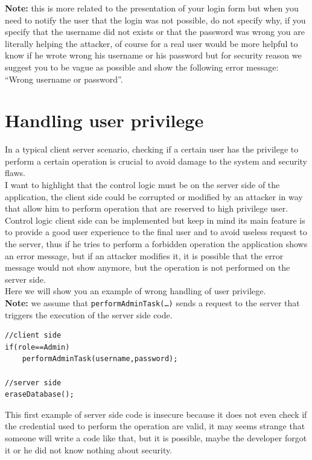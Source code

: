\textbf{Note:} this is more related to the presentation of your login form but when you need to notify the user that the login was not possible, do not specify why, if you specify that the username did not exists or that the password was wrong you are literally helping the attacker, of course for a real user would be more helpful to know if he wrote wrong his username or his password but for security reason we suggest you to be vague as possible and show the following error message: “Wrong username or password”.

\section{Handling user privilege}
In a typical client server scenario, checking if a certain user has the privilege to perform a certain operation is crucial to avoid damage to the system and security flaws.\\

I want to highlight that the control logic must be on the server side of the application, the client side could be corrupted or modified by an attacker in way that allow him to perform operation that are reserved to high privilege user.\\

Control logic client side can be implemented but keep in mind its main feature is to provide a good user experience to the final user and to avoid useless request to the server, thus if he tries to perform a forbidden operation the application shows an error message, but if an attacker modifies it, it is possible that the error message would not show anymore, but the operation is not performed on the server side.\\

Here we will show you an example of wrong handling of user privilege.\\
\textbf{Note:} we assume that \texttt{performAdminTask(…)} sends a request to the server that triggers the execution of the server side code.

\begin{lstlisting}
//client side
if(role==Admin)
	performAdminTask(username,password);

//server side
eraseDatabase();
\end{lstlisting}

This first example of server side code is insecure because it does not even check if the credential used to perform the operation are valid, it may seems strange that someone will write a code like that, but it is possible, maybe the developer forgot it or he did not know nothing about security.\\

